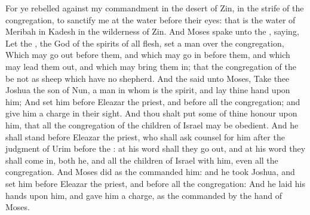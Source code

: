 \begin{biblechapter}
\verse For ye rebelled against my commandment in the desert of Zin, in the strife of the congregation, to sanctify me at the water before their eyes: that is the water of Meribah in Kadesh in the wilderness of Zin.
\verse And Moses spake unto the \LORD, saying,
\verse Let the \LORD, the God of the spirits of all flesh, set a man over the congregation,
\verse Which may go out before them, and which may go in before them, and which may lead them out, and which may bring them in; that the congregation of the \LORD be not as sheep which have no shepherd.
\verse And the \LORD said unto Moses, Take thee Joshua the son of Nun, a man in whom is the spirit, and lay thine hand upon him;
\verse And set him before Eleazar the priest, and before all the congregation; and give him a charge in their sight.
\verse And thou shalt put some of thine honour upon him, that all the congregation of the children of Israel may be obedient.
\verse And he shall stand before Eleazar the priest, who shall ask counsel for him after the judgment of Urim before the \LORD: at his word shall they go out, and at his word they shall come in, both he, and all the children of Israel with him, even all the congregation.
\verse And Moses did as the \LORD commanded him: and he took Joshua, and set him before Eleazar the priest, and before all the congregation:
\verse And he laid his hands upon him, and gave him a charge, as the \LORD commanded by the hand of Moses.
\end{biblechapter}

